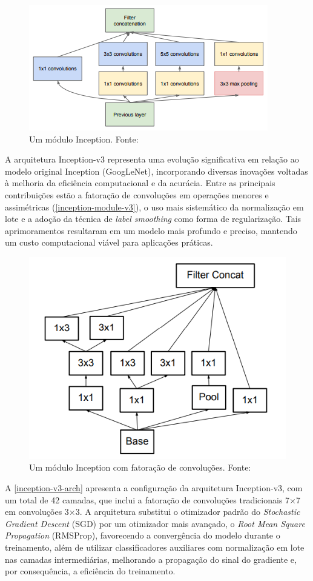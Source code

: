 \begin{figure}[!htbp]
    \centering
    \includegraphics[width=0.7\linewidth]{figs/inception-module.png}
    \caption{Um módulo Inception. Fonte: }
    \label{inception-module}
\end{figure}

A arquitetura Inception-v3 \cite{Szegedy2016} representa uma evolução significativa em relação ao modelo original Inception (GoogLeNet), incorporando diversas inovações voltadas à melhoria da eficiência computacional e da acurácia. Entre as principais contribuições estão a fatoração de convoluções em operações menores e assimétricas (\autoref{inception-module-v3}), o uso mais sistemático da normalização em lote e a adoção da técnica de \textit{label smoothing} como forma de regularização. Tais aprimoramentos resultaram em um modelo mais profundo e preciso, mantendo um custo computacional viável para aplicações práticas.

\begin{figure}[!htbp]
    \centering
    \includegraphics[width=0.5\linewidth]{figs/inception-module-v3.png}
    \caption{Um módulo Inception com fatoração de convoluções. Fonte: }
    \label{inception-module-v3}
\end{figure}

A \autoref{inception-v3-arch} apresenta a configuração da arquitetura Inception-v3, com um total de 42 camadas, que inclui a fatoração de convoluções tradicionais 7×7 em convoluções 3×3. A arquitetura substitui o otimizador padrão do \textit{Stochastic Gradient Descent} (SGD) por um otimizador mais avançado, o \textit{Root Mean Square Propagation} (RMSProp), favorecendo a convergência do modelo durante o treinamento, além de utilizar classificadores auxiliares com normalização em lote nas camadas intermediárias, melhorando a propagação do sinal do gradiente e, por consequência, a eficiência do treinamento.

